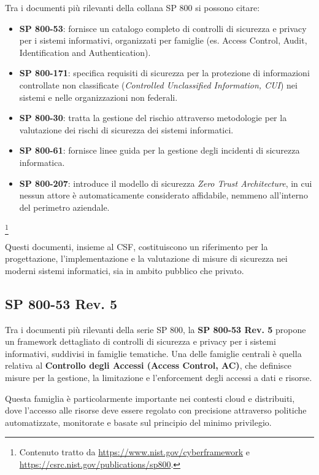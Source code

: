 Tra i documenti più rilevanti della collana SP 800 si possono citare:

\begin{itemize}
    \item \textbf{SP 800-53}: fornisce un catalogo completo di controlli di sicurezza e privacy per i sistemi informativi, organizzati per famiglie (es. Access Control, Audit, Identification and Authentication).
    \item \textbf{SP 800-171}: specifica requisiti di sicurezza per la protezione di informazioni controllate non classificate (\textit{Controlled Unclassified Information, CUI}) nei sistemi e nelle organizzazioni non federali.
    \item \textbf{SP 800-30}: tratta la gestione del rischio attraverso metodologie per la valutazione dei rischi di sicurezza dei sistemi informatici.
    \item \textbf{SP 800-61}: fornisce linee guida per la gestione degli incidenti di sicurezza informatica.
    \item \textbf{SP 800-207}: introduce il modello di sicurezza \textit{Zero Trust Architecture}, in cui nessun attore è automaticamente considerato affidabile, nemmeno all'interno del perimetro aziendale.
\end{itemize}

\footnote{Contenuto tratto da \url{https://www.nist.gov/cyberframework} e \url{https://csrc.nist.gov/publications/sp800}.}

Questi documenti, insieme al CSF, costituiscono un riferimento per la progettazione, l'implementazione e la valutazione di misure di sicurezza nei moderni sistemi informatici, sia in ambito pubblico che privato.


\subsection{SP 800-53 Rev. 5}
\label{sec:nist_sp800_ac}

Tra i documenti più rilevanti della serie SP 800, la \textbf{SP 800-53 Rev. 5} propone un framework dettagliato di controlli di sicurezza e privacy per i sistemi informativi, suddivisi in famiglie tematiche. Una delle famiglie centrali è quella relativa al \textbf{Controllo degli Accessi (Access Control, AC)}, che definisce misure per la gestione, la limitazione e l'enforcement degli accessi a dati e risorse.

Questa famiglia è particolarmente importante nei contesti cloud e distribuiti, dove l'accesso alle risorse deve essere regolato con precisione attraverso politiche automatizzate, monitorate e basate sul principio del minimo privilegio.

